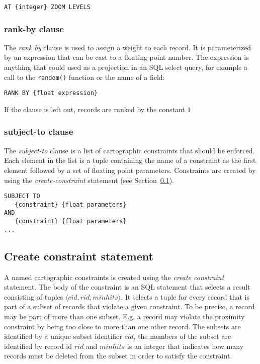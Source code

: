 \begin{lstlisting}
AT {integer} ZOOM LEVELS
\end{lstlisting}

\subsubsection{rank-by clause}

The \emph{rank by} clause is used to assign a weight to each record. It is parameterized by an expression that can be cast to a floating point number. The expression is anything that could used as a projection in an SQL select query, for example a call to the \texttt{random()} function or the name of a field:

\begin{lstlisting}
RANK BY {float expression}
\end{lstlisting}

If the clause is left out, records are ranked by the constant $1$

\subsubsection{subject-to clause}

The \emph{subject-to} clause is a list of cartographic constraints that should be enforced. Each element in the list is a tuple containing the name of a constraint as the first element followed by a set of floating point parameters. Constraints are created by using the \emph{create-constraint} statement (see Section~\ref{sec:create-constraint-statement}).

\begin{lstlisting}
SUBJECT TO 
   {constraint} {float parameters} 
AND
   {constraint} {float parameters}
...
\end{lstlisting}

\subsection{Create constraint statement}
\label{sec:create-constraint-statement}

A named cartographic constraints is created using the \emph{create constraint} statement. The body of the constraint is an SQL statement that selects a result consisting of tuples $\langle cid, rid, minhits \rangle$. It selects a tuple for every record that is part of a subset of records that violate a given constraint. To be precise, a record may be part of more than one subset. E.g. a record may violate the proximity constraint by being too close to more than one other record. The subsets are identified by a unique subset identifier $cid$,  the members of the subset are identified by record id $rid$ and $minhits$ is an integer that indicates how many records must be deleted from the subset in order to satisfy the constraint.

